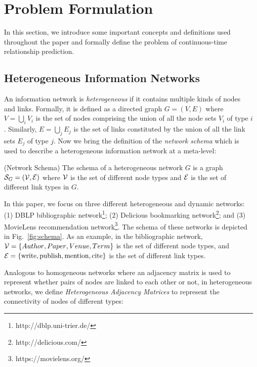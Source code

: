 \section{Problem Formulation}\label{sec:problem}
In this section, we introduce some important concepts and definitions used throughout the paper and formally define the problem of continuous-time relationship prediction.

\subsection{Heterogeneous Information Networks}

An information network is \emph{heterogeneous} if it contains multiple kinds of nodes and links. Formally, it is defined as a directed graph $G=(V,E)$ where $V = \bigcup_i V_i$ is the set of nodes comprising the union of all the node sets $V_i$ of type $i$. Similarly, $E=\bigcup_j E_j$ is the set of links constituted by the union of all the link sets $E_j$ of type $j$. Now we bring the definition of the \emph{network schema} \cite{sun2011pathsim} which is used to describe a heterogeneous information network at a meta-level:

\begin{definition}{(Network Schema)}
    The schema of a heterogeneous network $G$ is a graph $\mathcal{S}_G=(\mathcal{V}, \mathcal{E})$ where $\mathcal{V}$ is the set of different node types and $\mathcal{E}$ is the set of different link types in $G$.
\end{definition}

In this paper, we focus on three different heterogeneous and dynamic networks: (1) DBLP bibliographic network\footnote{http://dblp.uni-trier.de/}; (2) Delicious bookmarking network\footnote{http://delicious.com/}; and (3) MovieLens recommendation network\footnote{https://movielens.org/}. The schema of these networks is depicted in Fig.~\ref{fig:schema}. As an example, in the bibliographic network, $\mathcal{V}=\left\lbrace {Author}, {Paper}, {Venue}, {Term}\right\rbrace$ is the set of different node types, and $\mathcal{E}=\left\lbrace\text{write}, \text{publish}, \text{mention}, \text{cite}\right\rbrace$ is the set of different link types.

Analogous to homogeneous networks where an adjacency matrix is used to represent whether pairs of nodes are linked to each other or not, in heterogeneous networks, we define \emph{Heterogeneous Adjacency Matrices} to represent the connectivity of nodes of different types:

